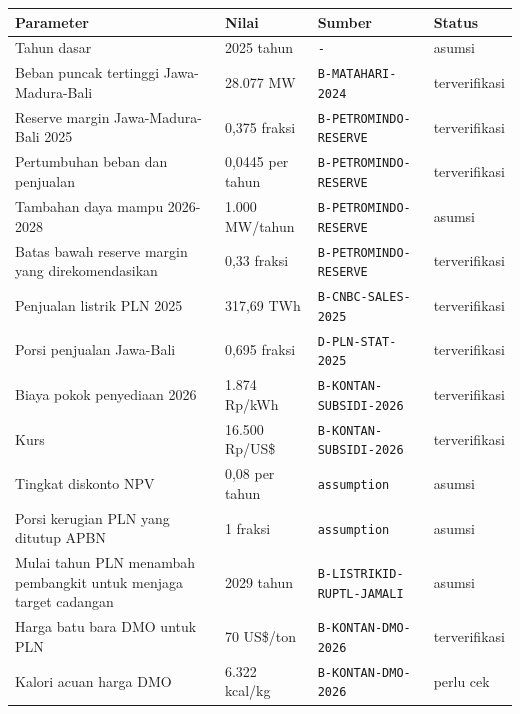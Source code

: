 \begin{longtable}{p{} p{} p{} p{}}
\toprule
Parameter & Nilai & Sumber & Status \\
\midrule
\endhead
Tahun dasar & 2025 tahun & \texttt{-\allowbreak{}} & asumsi \\
Beban puncak tertinggi Jawa-Madura-Bali & 28.077 MW & \texttt{B-\allowbreak{}MATAHARI-\allowbreak{}2024} & terverifikasi \\
Reserve margin Jawa-Madura-Bali 2025 & 0,375 fraksi & \texttt{B-\allowbreak{}PETROMINDO-\allowbreak{}RESERVE} & terverifikasi \\
Pertumbuhan beban dan penjualan & 0,0445 per tahun & \texttt{B-\allowbreak{}PETROMINDO-\allowbreak{}RESERVE} & terverifikasi \\
Tambahan daya mampu 2026-2028 & 1.000 MW/tahun & \texttt{B-\allowbreak{}PETROMINDO-\allowbreak{}RESERVE} & asumsi \\
Batas bawah reserve margin yang direkomendasikan & 0,33 fraksi & \texttt{B-\allowbreak{}PETROMINDO-\allowbreak{}RESERVE} & terverifikasi \\
Penjualan listrik PLN 2025 & 317,69 TWh & \texttt{B-\allowbreak{}CNBC-\allowbreak{}SALES-\allowbreak{}2025} & terverifikasi \\
Porsi penjualan Jawa-Bali & 0,695 fraksi & \texttt{D-\allowbreak{}PLN-\allowbreak{}STAT-\allowbreak{}2025} & terverifikasi \\
Biaya pokok penyediaan 2026 & 1.874 Rp/kWh & \texttt{B-\allowbreak{}KONTAN-\allowbreak{}SUBSIDI-\allowbreak{}2026} & terverifikasi \\
Kurs & 16.500 Rp/US\$ & \texttt{B-\allowbreak{}KONTAN-\allowbreak{}SUBSIDI-\allowbreak{}2026} & terverifikasi \\
Tingkat diskonto NPV & 0,08 per tahun & \texttt{assumption} & asumsi \\
Porsi kerugian PLN yang ditutup APBN & 1 fraksi & \texttt{assumption} & asumsi \\
Mulai tahun PLN menambah pembangkit untuk menjaga target cadangan & 2029 tahun & \texttt{B-\allowbreak{}LISTRIKID-\allowbreak{}RUPTL-\allowbreak{}JAMALI} & asumsi \\
Harga batu bara DMO untuk PLN & 70 US\$/ton & \texttt{B-\allowbreak{}KONTAN-\allowbreak{}DMO-\allowbreak{}2026} & terverifikasi \\
Kalori acuan harga DMO & 6.322 kcal/kg & \texttt{B-\allowbreak{}KONTAN-\allowbreak{}DMO-\allowbreak{}2026} & perlu cek \\

\end{longtable}
